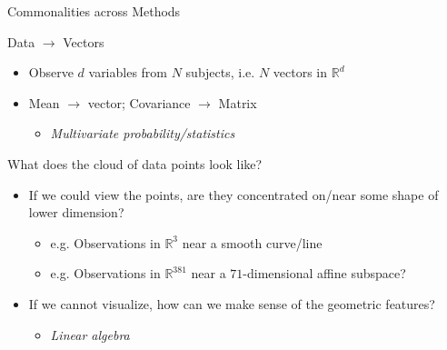 \documentclass{beamer}
\begin{document}
\begin{frame}{Commonalities across Methods}
\begin{block}{Data $\rightarrow$ Vectors}
\begin{itemize}
\item Observe $d$ variables from $N$ subjects, i.e. $N$ vectors in $\mathbb{R}^d$
\item Mean $\rightarrow$ vector; Covariance $\rightarrow$ Matrix
	\begin{itemize}
		\item \emph{Multivariate probability/statistics} \pause
	\end{itemize}
\end{itemize}
\end{block}

\begin{block}{What does the cloud of data points look like?}
\begin{itemize}
	\item If we could view the points, are they concentrated on/near some shape of lower dimension?
		\begin{itemize}
			\item e.g. Observations in $\mathbb{R}^3$ near a smooth curve/line
			\item e.g. Observations in $\mathbb{R}^{381}$ near a $71$-dimensional affine subspace?
		\end{itemize}
	\item If we cannot visualize, how can we make sense of the geometric features?
		\begin{itemize}
			\item \emph{Linear algebra}
		\end{itemize}
\end{itemize}
\end{block}

\end{frame}
\end{document}
